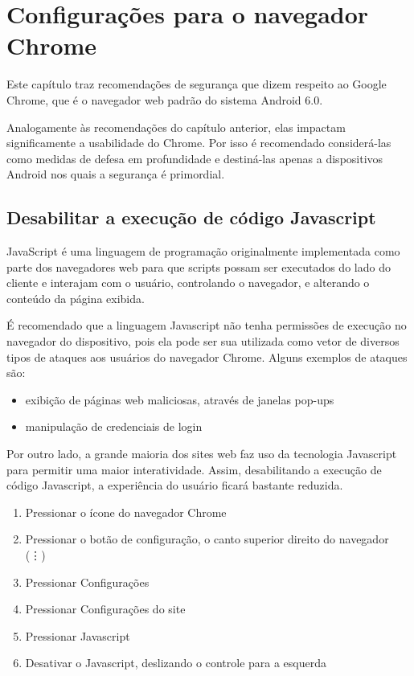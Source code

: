 \chapter{Configura\c c\~oes para o navegador Chrome}

Este cap\'itulo traz recomenda\c c\~oes de seguran\c ca que dizem respeito ao Google Chrome, que \'e o navegador web padr\~ao do sistema Android 6.0.

Analogamente \`as recomenda\c c\~oes do cap\'itulo anterior, elas impactam significamente a usabilidade do Chrome. Por isso \'e recomendado consider\'a-las como medidas de defesa em profundidade e destin\'a-las apenas a dispositivos Android nos quais a seguran\c ca \'e primordial.

\section{Desabilitar a execu\c c\~ao de c\'odigo Javascript}

JavaScript \'e uma linguagem de programa\c c\~ao originalmente implementada como parte dos navegadores web para que scripts possam ser executados do lado do cliente e interajam com o usu\'ario, controlando o navegador, e alterando o conte\'udo da p\'agina exibida. 

\'E recomendado que a linguagem Javascript n\~ao tenha permiss\~oes de execu\c c\~ao no navegador do dispositivo, pois ela pode ser sua utilizada como vetor de diversos tipos de ataques aos usu\'arios do navegador Chrome. Alguns exemplos de ataques s\~ao:

\begin{itemize}
\item exibi\c c\~ao de p\'aginas web maliciosas, atrav\'es de janelas pop-ups
\item manipula\c c\~ao de credenciais de login
\end{itemize}

Por outro lado, a grande maioria dos sites web faz uso da tecnologia Javascript para permitir uma maior interatividade. Assim, desabilitando a execu\c c\~ao de c\'odigo Javascript, a experi\^encia do usu\'ario ficar\'a bastante reduzida.

\begin{enumerate}
\item Pressionar o \'icone do navegador Chrome
\item Pressionar o bot\~ao de configura\c c\~ao, o canto superior direito do navegador (\vdots)
\item Pressionar Configura\c c\~oes
\item Pressionar Configura\c c\~oes do site
\item Pressionar Javascript
\item Desativar o Javascript, deslizando o controle para a esquerda
\end{enumerate}

